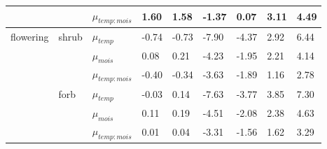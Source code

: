 \documentclass{article}
\begin{document}
\begin{table}[ht]
\begin{tabular}{|p{}|p{}|p{}|p{}p{}p{}p{}p{}p{}|}
   &  & $\mu_{temp:mois}$ & 1.60 & 1.58 & -1.37 & 0.07 & 3.11 & 4.49 \\ 
   \hline
flowering & shrub & $\mu_{temp}$ & -0.74 & -0.73 & -7.90 & -4.37 & 2.92 & 6.44 \\ 
   &  & $\mu_{mois}$ & 0.08 & 0.21 & -4.23 & -1.95 & 2.21 & 4.14 \\ 
   &  & $\mu_{temp:mois}$ & -0.40 & -0.34 & -3.63 & -1.89 & 1.16 & 2.78 \\ 
   & forb & $\mu_{temp}$ & -0.03 & 0.14 & -7.63 & -3.77 & 3.85 & 7.30 \\ 
   &  & $\mu_{mois}$ & 0.11 & 0.19 & -4.51 & -2.08 & 2.38 & 4.63 \\ 
   &  & $\mu_{temp:mois}$ & 0.01 & 0.04 & -3.31 & -1.56 & 1.62 & 3.29 \\ 
   \hline
\end{tabular}
\endgroup
\end{table}
\end{document}
